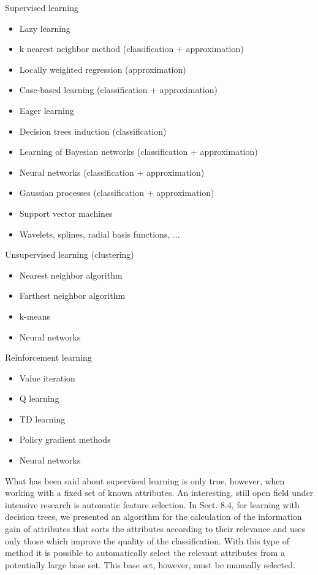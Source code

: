 \documentclass[10pt]{article}
\begin{document}
Supervised learning

\begin{itemize}
  \item Lazy learning
  \item k nearest neighbor method (classification + approximation)
  \item Locally weighted regression (approximation)
  \item Case-based learning (classification + approximation)
  \item Eager learning
  \item Decision trees induction (classification)
  \item Learning of Bayesian networks (classification + approximation)
  \item Neural networks (classification + approximation)
  \item Gaussian processes (classification + approximation)
  \item Support vector machines
  \item Wavelets, splines, radial basis functions, ...
\end{itemize}

Unsupervised learning (clustering)

\begin{itemize}
  \item Nearest neighbor algorithm
  \item Farthest neighbor algorithm
  \item k-means
  \item Neural networks
\end{itemize}

Reinforcement learning

\begin{itemize}
  \item Value iteration
  \item Q learning
  \item TD learning
  \item Policy gradient methods
  \item Neural networks
\end{itemize}

What has been said about supervised learning is only true, however, when working with a fixed set of known attributes. An interesting, still open field under intensive research is automatic feature selection. In Sect. 8.4, for learning with decision trees, we presented an algorithm for the calculation of the information gain of attributes that sorts the attributes according to their relevance and uses only those which improve the quality of the classification. With this type of method it is possible to automatically select the relevant attributes from a potentially large base set. This base set, however, must be manually selected.
\end{document}
